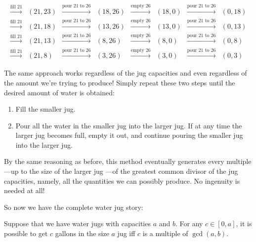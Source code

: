 \[\begin{array}{cccccccc}
\xrightarrow{\text{fill 21}} & (21,23)&
\xrightarrow{\text{pour 21 to 26}} & (18,26)& \xrightarrow{\text{empty
    26}} & (18,0)& \xrightarrow{\text{pour 21 to 26}} &
(0,18)\\
\xrightarrow{\text{fill 21}} & (21,18)&
\xrightarrow{\text{pour 21 to 26}} & (13,26)& \xrightarrow{\text{empty
    26}} & (13,0)& \xrightarrow{\text{pour 21 to 26}} &
(0,13)\\
\xrightarrow{\text{fill 21}} & (21,13)&
\xrightarrow{\text{pour 21 to 26}} & (8,26)& \xrightarrow{\text{empty
    26}} & (8,0)& \xrightarrow{\text{pour 21 to 26}} &
(0,8)\\
\xrightarrow{\text{fill 21}} & (21,8)& \xrightarrow{\text{pour
    21 to 26}} & (3,26)& \xrightarrow{\text{empty 26}} & (3,0)&
\xrightarrow{\text{pour 21 to 26}} & (0,3)
\end{array}
\]

The same approach works regardless of the jug capacities and even
regardless of the amount we're trying to produce!  Simply repeat these
two steps until the desired amount of water is obtained:
\begin{enumerate}
\item Fill the smaller jug.

\item Pour all the water in the smaller jug into the larger jug.  If
  at any time the larger jug becomes full, empty it out, and continue
  pouring the smaller jug into the larger jug.
\end{enumerate}
By the same reasoning as before, this method eventually generates
every multiple ---up to the size of the larger jug ---of the greatest
common divisor of the jug capacities, namely, all the quantities we
can possibly produce.  No ingenuity is needed at all!

So now we have the complete water jug story:
\begin{theorem}\label{th:waterjugs}
Suppose that we have water jugs with capacities $a$ and $b$.  For any
$c \in [0,a]$, it is possible to get $c$ gallons in the size $a$ jug
iff $c$ is a multiple of $\gcd(a, b)$.
\end{theorem}

